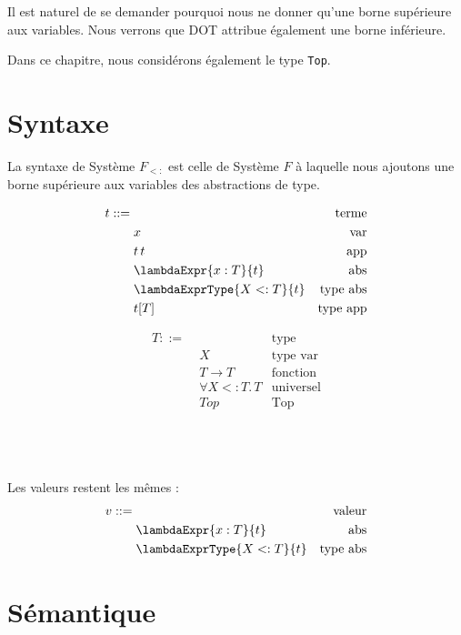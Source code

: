 Il est naturel de se demander pourquoi nous ne donner qu'une borne
supérieure aux variables. Nous verrons que DOT attribue également une borne inférieure.

Dans ce chapitre, nous considérons également le type \verb|Top|.

\section{Syntaxe}

La syntaxe de Système $F_{<:}$ est celle de Système $F$ à laquelle nous ajoutons
une borne supérieure aux variables des abstractions de type.

\begin{minipage}{0.45\textwidth}
  \begin{align*}
    t ::= & \, & \text{terme} \\
          & \; x & \text{var} \\
          & \; t \, t & \text{app} \\
          & \; \lambdaExpr{x : T}{t} & \text{abs} \\
          & \; \lambdaExprType{X <: T}{t} & \text{type abs} \\
          & \; t[T] & \text{type app}
  \end{align*}
\end{minipage}
\begin{minipage}{0.45\textwidth}
  \begin{align*}
    T ::= & \, & \text{type} \\
          & \; X & \text{type var} \\
          & \; T \rightarrow T & \text{fonction} \\
          & \; \forall X <: T. \, T & \text{universel} \\
          & \; Top & \text{Top}
  \end{align*}
\end{minipage}
\\
\\
\\
Les valeurs restent les mêmes :
\begin{align*}
  v ::= & \, & \text{valeur} \\
        & \; \lambdaExpr{x : T}{t} & \text{abs} \\
        & \; \lambdaExprType{X <: T}{t} & \text{type abs}
\end{align*}

\section{Sémantique}

